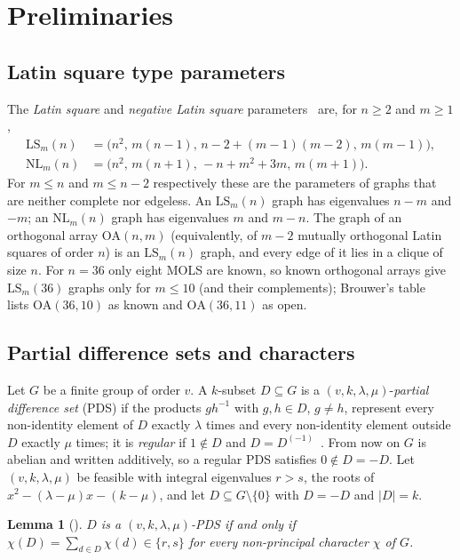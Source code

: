 \documentclass[11pt]{amsart}
\newtheorem{lemma}[theorem]{Lemma}
\theoremstyle{definition}
\newcommand{\LS}{\mathrm{LS}}
\newcommand{\NL}{\mathrm{NL}}
\begin{document}
\section{Preliminaries}\label{sec:prelim}

\subsection{Latin square type parameters}
The \emph{Latin square} and \emph{negative Latin square} parameters~\cite[Section~2]{Ma1994} are, for $n\ge2$ and $m\ge1$,
\begin{align*}
\LS_m(n)&=\bigl(n^2,\,m(n-1),\,n-2+(m-1)(m-2),\,m(m-1)\bigr),\\
\NL_m(n)&=\bigl(n^2,\,m(n+1),\,-n+m^2+3m,\,m(m+1)\bigr).
\end{align*}
For $m\le n$ and $m\le n-2$ respectively these are the parameters of graphs that are neither complete nor edgeless. An $\LS_m(n)$ graph has eigenvalues $n-m$ and $-m$; an $\NL_m(n)$ graph has eigenvalues $m$ and $m-n$. The graph of an orthogonal array $\mathrm{OA}(n,m)$ (equivalently, of $m-2$ mutually orthogonal Latin squares of order $n$) is an $\LS_m(n)$ graph, and every edge of it lies in a clique of size $n$. For $n=36$ only eight MOLS are known, so known orthogonal arrays give $\LS_m(36)$ graphs only for $m\le10$ (and their complements); Brouwer's table~\cite{BrouwerTable} lists $\mathrm{OA}(36,10)$ as known and $\mathrm{OA}(36,11)$ as open.

\subsection{Partial difference sets and characters}
Let $G$ be a finite group of order $v$. A $k$-subset $D\subseteq G$ is a $(v,k,\lambda,\mu)$-\emph{partial difference set} (PDS) if the products $gh^{-1}$ with $g,h\in D$, $g\ne h$, represent every non-identity element of $D$ exactly $\lambda$ times and every non-identity element outside $D$ exactly $\mu$ times; it is \emph{regular} if $1\notin D$ and $D=D^{(-1)}$~\cite[Section~1]{Ma1994}. From now on $G$ is abelian and written additively, so a regular PDS satisfies $0\notin D=-D$. Let $(v,k,\lambda,\mu)$ be feasible with integral eigenvalues $r>s$, the roots of $x^2-(\lambda-\mu)x-(k-\mu)$, and let $D\subseteq G\setminus\{0\}$ with $D=-D$ and $|D|=k$.

\begin{lemma}[{\cite[Corollary~3.3]{Ma1994}}]\label{lem:char}
$D$ is a $(v,k,\lambda,\mu)$-PDS if and only if $\chi(D)=\sum_{d\in D}\chi(d)\in\{r,s\}$ for every non-principal character $\chi$ of $G$.
\end{lemma}
\end{document}
